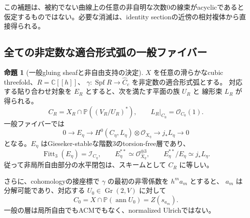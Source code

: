 \documentclass[a4paper,11pt]{ltjsarticle}
\theoremstyle{definition}
\newtheorem{theorem}{命題}[section]
\newcommand{\CC}{\mathbb C}
\newcommand{\OO}{\mathcal O}
\newcommand{\PP}{\mathbb P}
\newcommand{\Gr}{\operatorname{Gr}}
\newcommand{\Spf}{\operatorname{Spf}}
\begin{document}
この補題は、被約でない曲線上の任意の非自明な次数0の線束がacyclicであると
仮定するものではない。必要な消滅は、identity sectionの近傍の相対複体から直接得られる。

\subsection{全ての非定数な適合形式弧の一般ファイバー}

\begin{theorem}[一般gluing sheafと非自由支持の決定]\label{thm:all-compatible-arcs}
$X$ を任意の滑らかなcubic threefold、$R=\CC[[h]]$、
$\gamma:\Spf R\to\widehat C_c$ を非定数の適合形式弧とする。
対応する貼り合わせ対象を $E_R$ とすると、次を満たす平面の族 $U_R$ と
線形束 $L_R$ が得られる。
\[
 C_R=X_R\cap\PP((V_R/U_R)^*),\qquad
 L_R|_{C_0}=\OO_{C_0}(1).
\]
一般ファイバーでは
\begin{equation}\label{eq:all-arcs-evaluation}
 0\longrightarrow E_\eta
 \longrightarrow H^0(C_\eta,L_\eta)\otimes\OO_{X_\eta}
 \longrightarrow j_*L_\eta\longrightarrow0
\end{equation}
となる。$E_\eta$ はGieseker-stableな階数3のtorsion-free層であり、
\[
 \operatorname{Fitt}_3(E_\eta)=\mathcal I_{C_\eta},\qquad
 E_\eta^{**}\simeq\OO_{X_\eta}^{\oplus3},\qquad
 E_\eta^{**}/E_\eta\simeq j_*L_\eta.
\]
従って非局所自由部分の水平閉包は、スキームとして $C_R$ に等しい。

さらに、cohomologyの接座標で $\gamma$ の最初の非零係数を $h^m a_m$ とすると、
$a_m$ は分解可能であり、対応する $U_0\in\Gr(2,V)$ に対して
\[
 C_0=X\cap\PP(\operatorname{ann}U_0)=Z(s_{a_m}).
\]
一般の層は局所自由でもACMでもなく、normalized Ulrichではない。
\end{theorem}
\end{document}
